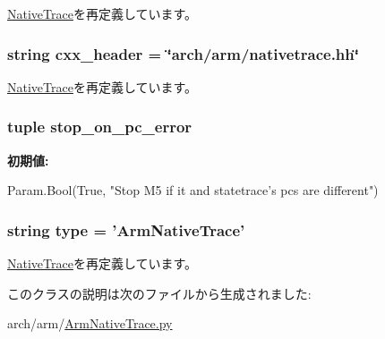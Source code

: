 \hyperlink{classNativeTrace_1_1NativeTrace_a58cd55cd4023648e138237cfc0822ae3}{NativeTrace}を再定義しています。\hypertarget{classArmNativeTrace_1_1ArmNativeTrace_a17da7064bc5c518791f0c891eff05fda}{
\subsubsection[{cxx\_\-header}]{\setlength{\rightskip}{0pt plus 5cm}string {\bf cxx\_\-header} = \char`\"{}arch/arm/nativetrace.hh\char`\"{}}}
\label{classArmNativeTrace_1_1ArmNativeTrace_a17da7064bc5c518791f0c891eff05fda}


\hyperlink{classNativeTrace_1_1NativeTrace_a17da7064bc5c518791f0c891eff05fda}{NativeTrace}を再定義しています。\hypertarget{classArmNativeTrace_1_1ArmNativeTrace_a537ebf35caf142e3300d5be26feb06f9}{
\subsubsection[{stop\_\-on\_\-pc\_\-error}]{\setlength{\rightskip}{0pt plus 5cm}tuple {\bf stop\_\-on\_\-pc\_\-error}}}
\label{classArmNativeTrace_1_1ArmNativeTrace_a537ebf35caf142e3300d5be26feb06f9}
{\bfseries 初期値:}
\begin{DoxyCode}
Param.Bool(True,
            "Stop M5 if it and statetrace's pcs are different")
\end{DoxyCode}
\hypertarget{classArmNativeTrace_1_1ArmNativeTrace_acce15679d830831b0bbe8ebc2a60b2ca}{
\subsubsection[{type}]{\setlength{\rightskip}{0pt plus 5cm}string {\bf type} = '{\bf ArmNativeTrace}'}}
\label{classArmNativeTrace_1_1ArmNativeTrace_acce15679d830831b0bbe8ebc2a60b2ca}


\hyperlink{classNativeTrace_1_1NativeTrace_acce15679d830831b0bbe8ebc2a60b2ca}{NativeTrace}を再定義しています。

このクラスの説明は次のファイルから生成されました:\begin{DoxyCompactItemize}
\item 
arch/arm/\hyperlink{ArmNativeTrace_8py}{ArmNativeTrace.py}\end{DoxyCompactItemize}
